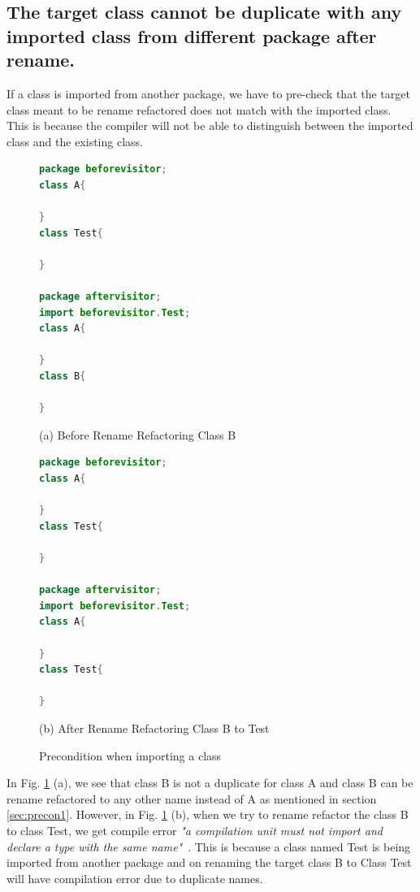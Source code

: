 \subsection{The target class cannot be duplicate with any imported class from different package after rename.}

If a class is imported from another package, we have to pre-check that the target class meant to be rename refactored does not match with the imported class. This is because the compiler will not be able to distinguish between the imported class and the existing class. 

\begin{figure}[th]
\centering
\begin{minipage}[t]{0.6\linewidth}
\begin{lstlisting}[language=java, basicstyle=\scriptsize\ttfamily,frame=single]
package beforevisitor;
class A{
    
}	
class Test{

}

package aftervisitor;
import beforevisitor.Test;
class A{

}
class B{

} 

\end{lstlisting}
\tiny{(a) Before Rename Refactoring Class B}
\end{minipage}
\hfill

\begin{minipage}[t]{0.6\linewidth}
\begin{lstlisting}[language=java, basicstyle=\scriptsize\ttfamily,frame=single]
package beforevisitor;
class A{
    
}	
class Test{

}

package aftervisitor;
import beforevisitor.Test;
class A{

}
class Test{

} 
\end{lstlisting}
\tiny{(b) After Rename Refactoring Class B to Test}
\end{minipage}
\caption{Precondition when importing a class}
\label{figure:fig2}
\end{figure}

In Fig. \ref{figure:fig2} (a), we see that class B is not a duplicate for class A and class B can be rename refactored to any other name instead of A as mentioned in section \ref{sec:precon1}. However, in Fig. \ref{figure:fig2} (b), when we try to rename refactor the class B to class Test, we get compile error \textit{"a compilation unit must not import and declare a type with the same name"}~\cite{EclipseWebPage}. 
This is because a class named Test is being imported from another package and on renaming the target class B to Class Test will have compilation error due to duplicate names. 

